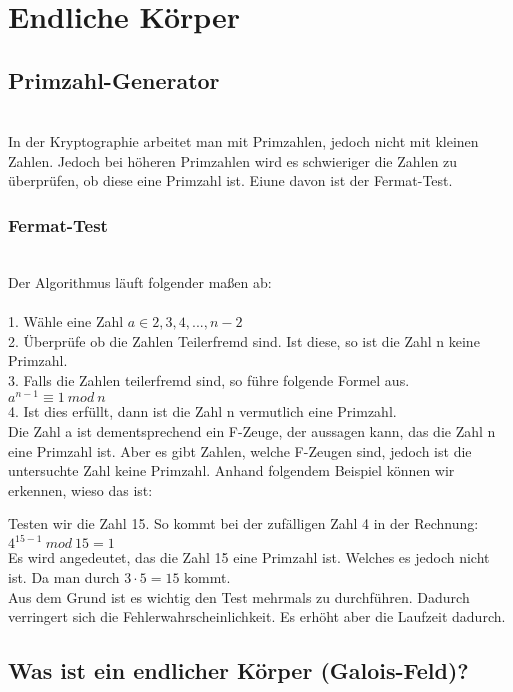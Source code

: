 \chapter{Endliche Körper}

\section{Primzahl-Generator}
\\
In der Kryptographie arbeitet man mit Primzahlen, jedoch nicht mit kleinen Zahlen.
Jedoch bei höheren Primzahlen wird es schwieriger die Zahlen zu überprüfen, ob diese eine Primzahl ist.
Eiune davon ist der Fermat-Test.

\subsection{Fermat-Test}
\\
Der Algorithmus läuft folgender maßen ab:\\
\\
1. Wähle eine Zahl $ a \in {2,3,4,...,n-2}$ \\
2. Überprüfe ob die Zahlen Teilerfremd sind. Ist diese, so ist die Zahl n keine Primzahl.\\
3. Falls die Zahlen teilerfremd sind, so führe folgende Formel aus.\\
$
a^{n-1} \equiv  1\ mod\ n
$\\
4. Ist dies erfüllt, dann ist die Zahl n vermutlich eine Primzahl. 
\\
Die Zahl a ist dementsprechend ein F-Zeuge, der aussagen kann, das die Zahl n eine Primzahl ist.
Aber es gibt Zahlen, welche F-Zeugen sind, jedoch ist die untersuchte Zahl keine Primzahl.
Anhand folgendem Beispiel können wir erkennen, wieso das ist:

Testen wir die Zahl 15. So kommt bei der zufälligen Zahl 4 in der Rechnung: \\
$
4^{15-1}\ mod\ 15 = 1
$\\
Es wird angedeutet, das die Zahl 15 eine Primzahl ist. Welches es jedoch nicht ist. Da man durch $3 \cdot 5 = 15$ kommt.\\
Aus dem Grund ist es wichtig den Test mehrmals zu durchführen. Dadurch verringert sich die Fehlerwahrscheinlichkeit. Es erhöht aber die Laufzeit dadurch.\\

\newpage
\section{Was ist ein endlicher Körper (Galois-Feld)?}\\
\\

